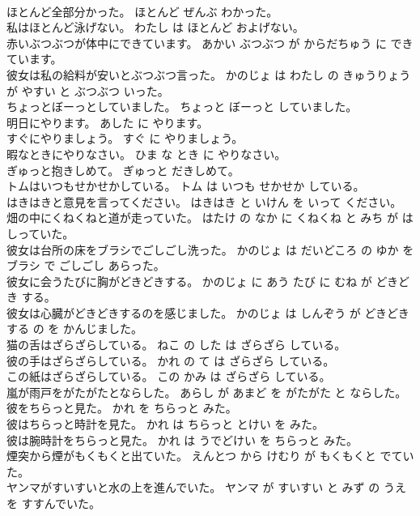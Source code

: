 \documentclass[8pt]{extreport}
\begin{document}
\begin{CJK}{UTF8}{min}
\\	ほとんど全部分かった。	ほとんど ぜんぶ わかった。	
\\	私はほとんど泳げない。	わたし は ほとんど およげない。	
\\	赤いぶつぶつが体中にできています。	あかい ぶつぶつ が からだちゅう に できています。	
\\	彼女は私の給料が安いとぶつぶつ言った。	かのじょ は わたし の きゅうりょう が やすい と ぶつぶつ いった。	
\\	ちょっとぼーっとしていました。	ちょっと ぼーっと していました。	
\\	明日にやります。	あした に やります。	
\\	すぐにやりましょう。	すぐ に やりましょう。	
\\	暇なときにやりなさい。	ひま な とき に やりなさい。	
\\	ぎゅっと抱きしめて。	ぎゅっと だきしめて。	
\\	トムはいつもせかせかしている。	トム は いつも せかせか している。	
\\	はきはきと意見を言ってください。	はきはき と いけん を いって ください。	
\\	畑の中にくねくねと道が走っていた。	はたけ の なか に くねくね と みち が はしっていた。	
\\	彼女は台所の床をブラシでごしごし洗った。	かのじょ は だいどころ の ゆか を ブラシ で ごしごし あらった。	
\\	彼女に会うたびに胸がどきどきする。	かのじょ に あう たび に むね が どきどき する。	
\\	彼女は心臓がどきどきするのを感じました。	かのじょ は しんぞう が どきどき する の を かんじました。	
\\	猫の舌はざらざらしている。	ねこ の した は ざらざら している。	
\\	彼の手はざらざらしている。	かれ の て は ざらざら している。	
\\	この紙はざらざらしている。	この かみ は ざらざら している。	
\\	嵐が雨戸をがたがたとならした。	あらし が あまど を がたがた と ならした。	
\\	彼をちらっと見た。	かれ を ちらっと みた。	
\\	彼はちらっと時計を見た。	かれ は ちらっと とけい を みた。	
\\	彼は腕時計をちらっと見た。	かれ は うでどけい を ちらっと みた。	
\\	煙突から煙がもくもくと出ていた。	えんとつ から けむり が もくもくと でていた。	
\\	ヤンマがすいすいと水の上を進んでいた。	ヤンマ が すいすい と みず の うえ を すすんでいた。	

\end{CJK}
\end{document}
